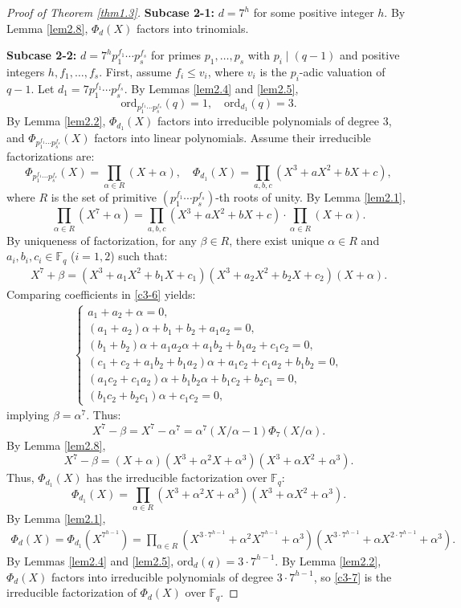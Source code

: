 \documentclass[10pt,reqno]{amsart}
\theoremstyle{definition}
\theoremstyle{remark}
\numberwithin{equation}{section}
\begin{document}
\begin{proof}[Proof of Theorem \ref{thm1.3}]
\textbf{Subcase 2-1:}  $d = 7^h$ for some positive integer $h$. By Lemma \ref{lem2.8}, $\Phi_d(X)$ factors into trinomials.

\textbf{Subcase 2-2: }$d = 7^h p_1^{f_1} \cdots p_s^{f_s}$ for primes $p_1, \ldots, p_s$ with $p_i \mid (q - 1)$ and positive integers $h, f_1, \ldots, f_s$. First, assume $f_i \leq v_i$, where $v_i$ is the $p_i$-adic valuation of $q - 1$. Let $d_1 = 7 p_1^{f_1} \cdots p_s^{f_s}$. By Lemmas \ref{lem2.4} and \ref{lem2.5},
$$\text{ord}_{p_1^{f_1} \cdots p_s^{f_s}}(q) = 1, \quad \text{ord}_{d_1}(q) = 3.$$
By Lemma \ref{lem2.2}, $\Phi_{d_1}(X)$ factors into irreducible polynomials of degree 3, and $\Phi_{p_1^{f_1} \cdots p_s^{f_s}}(X)$ factors into linear polynomials. Assume their irreducible factorizations are:
\[
\Phi_{p_1^{f_1} \cdots p_s^{f_s}}(X) = \prod_{\alpha \in R} (X + \alpha), \quad \Phi_{d_1}(X) = \prod_{a, b, c} (X^3 + a X^2 + b X + c),
\]
where $R$ is the set of primitive $(p_1^{f_1} \cdots p_s^{f_s})$-th roots of unity. By Lemma \ref{lem2.1},
\[
\prod_{\alpha \in R} (X^7 + \alpha) = \prod_{a, b, c} (X^3 + a X^2 + b X + c) \cdot \prod_{\alpha \in R} (X + \alpha).
\]
By uniqueness of factorization, for any $\beta \in R$, there exist unique $\alpha \in R$ and $a_i, b_i, c_i \in \mathbb{F}_q$ ($i=1,2$) such that:
\begin{align}\label{c3-6}
X^7 + \beta = (X^3 + a_1 X^2 + b_1 X + c_1)(X^3 + a_2 X^2 + b_2 X + c_2)(X + \alpha).
\end{align}
Comparing coefficients in \eqref{c3-6} yields:
\begin{align*}
\begin{cases}
a_1 + a_2 + \alpha = 0,\\
(a_1 + a_2) \alpha + b_1 + b_2 + a_1 a_2 = 0,\\
(b_1 + b_2) \alpha + a_1 a_2 \alpha + a_1 b_2 + b_1 a_2 + c_1 c_2 = 0,\\
(c_1 + c_2 + a_1 b_2 + b_1 a_2) \alpha + a_1 c_2 + c_1 a_2 + b_1 b_2 = 0,\\
(a_1 c_2 + c_1 a_2) \alpha + b_1 b_2 \alpha + b_1 c_2 + b_2 c_1 = 0,\\
(b_1 c_2 + b_2 c_1) \alpha + c_1 c_2 = 0,
\end{cases}
\end{align*}
implying $\beta = \alpha^7$. Thus:
\[
X^7 - \beta = X^7 - \alpha^7 = \alpha^7 (X/\alpha - 1) \Phi_7(X/\alpha).
\]
By Lemma \ref{lem2.8},
\[
X^7 - \beta = (X + \alpha)(X^3 + \alpha^2 X + \alpha^3)(X^3 + \alpha X^2 + \alpha^3).
\]
Thus, $\Phi_{d_1}(X)$ has the irreducible factorization over $\mathbb{F}_q$:
\[
\Phi_{d_1}(X) = \prod_{\alpha \in R} (X^3 + \alpha^2 X + \alpha^3)(X^3 + \alpha X^2 + \alpha^3).
\]
By Lemma \ref{lem2.1},
\begin{align}\label{c3-7}
\Phi_d(X) = \Phi_{d_1}(X^{7^{h-1}}) = \prod_{\alpha \in R} (X^{3 \cdot 7^{h-1}} + \alpha^2 X^{7^{h-1}} + \alpha^3)(X^{3 \cdot 7^{h-1}} + \alpha X^{2 \cdot 7^{h-1}} + \alpha^3).
\end{align}
By Lemmas \ref{lem2.4} and \ref{lem2.5}, $\text{ord}_d(q) = 3 \cdot 7^{h-1}$. By Lemma \ref{lem2.2}, $\Phi_d(X)$ factors into irreducible polynomials of degree $3 \cdot 7^{h-1}$, so \eqref{c3-7} is the irreducible factorization of $\Phi_d(X)$ over $\mathbb{F}_q$.


\end{proof}
\end{document}
